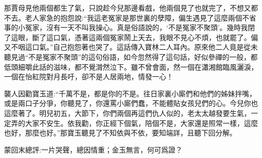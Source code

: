 \begin{parag}
    那賈母見他兩個都生了氣，只說趁今兒那邊看戲，他兩個見了也就完了，不想又都不去。老人家急的抱怨說:“我這老冤家是那世裏的孽障，偏生遇見了這麼兩個不省事的小冤家，沒有一天不叫我操心。真是俗語說的，‘不是冤家不聚頭’。幾時我閉了這眼，斷了這口氣，憑著這兩個冤家鬧上天去，我眼不見心不煩，也就罷了。偏又不咽這口氣。”自己抱怨著也哭了。這話傳入寶林二人耳內。原來他二人竟是從未聽見過“不是冤家不聚頭”的這句俗語，如今忽然得了這句話，好似參禪的一般，都低頭細嚼此話的滋味，都不覺潸然泣下。雖不曾會面，然一個在瀟湘館臨風灑淚，一個在怡紅院對月長吁，卻不是人居兩地，情發一心！
\end{parag}


\begin{parag}
    襲人因勸寶玉道:“千萬不是，都是你的不是。往日家裏小廝們和他們的姊妹拌嘴，或是兩口子分爭，你聽見了，你還罵小廝們蠢，不能體貼女孩兒們的心。今兒你也這麼著了。明兒初五，大節下，你們兩個再這們仇人似的，老太太越發要生氣，一定弄的大家不安生。依我勸，你正經下個氣，陪個不是，大家還是照常一樣，這麼也好，那麼也好。”那寶玉聽見了不知依與不依，要知端詳，且聽下回分解。
\end{parag}


\begin{parag}
    \begin{note}蒙回末總評:一片哭聲，總因情重；金玉無言，何可爲證？\end{note}
\end{parag}

